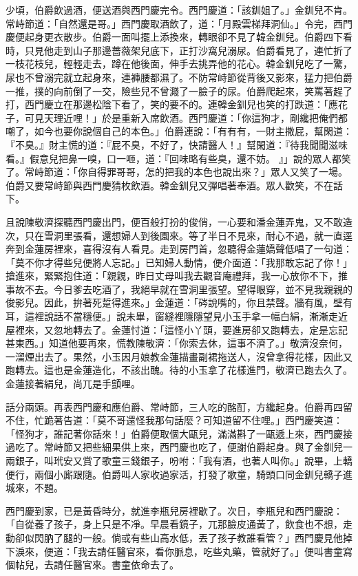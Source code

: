 少頃，伯爵飲過酒，便送酒與西門慶完令。西門慶道：「該釧姐了。」金釧兒不肯。常峙節道：「自然還是哥。」西門慶取酒飲了，道：「月殿雲梯拜洞仙。」令完，西門慶便起身更衣散步。伯爵一面叫擺上添換來，轉眼卻不見了韓金釧兒。伯爵四下看時，只見他走到山子那邊薔薇架兒底下，正打沙窩兒溺尿。伯爵看見了，連忙折了一枝花枝兒，輕輕走去，蹲在他後面，伸手去挑弄他的花心。韓金釧兒吃了一驚，尿也不曾溺完就立起身來，連褲腰都濕了。不防常峙節從背後又影來，猛力把伯爵一推，撲的向前倒了一交，險些兒不曾濺了一臉子的尿。伯爵爬起來，笑罵著趕了打，西門慶立在那邊松陰下看了，笑的要不的。連韓金釧兒也笑的打跌道：「應花子，可見天理近哩！」於是重新入席飲酒。西門慶道：「你這狗才，剛纔把俺們都嘲了，如今也要你說個自己的本色。」伯爵連說：「有有有，一財主撒屁，幫閑道：『不臭。』財主慌的道：『屁不臭，不好了，快請醫人！』幫閑道：『待我聞聞滋味看。』假意兒把鼻一嗅，口一咂，道：『回味略有些臭，還不妨。 』」說的眾人都笑了。常峙節道：「你自得罪哥哥，怎的把我的本色也說出來？」眾人又笑了一場。伯爵又要常峙節與西門慶猜枚飲酒。韓金釧兒又彈唱著奉酒。眾人歡笑，不在話下。

且說陳敬濟探聽西門慶出門，便百般打扮的俊俏，一心要和潘金蓮弄鬼，又不敢造次，只在雪洞里張看，還想婦人到後園來。等了半日不見來，耐心不過，就一直逕奔到金蓮房裡來，喜得沒有人看見。走到房門首，忽聽得金蓮嬌聲低唱了一句道：「莫不你才得些兒便將人忘記。」已知婦人動情，便介面道：「我那敢忘記了你！」搶進來，緊緊抱住道：「親親，昨日丈母叫我去觀音庵禮拜，我一心放你不下，推事故不去。今日爹去吃酒了，我絕早就在雪洞里張望。望得眼穿，並不見我親親的俊影兒。因此，拚著死踅得進來。」金蓮道：「硶說嘴的，你且禁聲。牆有風，壁有耳，這裡說話不當穩便。」說未畢，窗縫裡隱隱望見小玉手拿一幅白絹，漸漸走近屋裡來，又忽地轉去了。金蓮忖道：「這怪小丫頭，要進房卻又跑轉去，定是忘記甚東西。」知道他要再來，慌教陳敬濟：「你索去休，這事不濟了。」敬濟沒奈何，一溜煙出去了。果然，小玉因月娘教金蓮描畫副裙拖送人，沒曾拿得花樣，因此又跑轉去。這也是金蓮造化，不該出醜。待的小玉拿了花樣進門，敬濟已跑去久了。金蓮接著絹兒，尚兀是手顫哩。

話分兩頭。再表西門慶和應伯爵、常峙節，三人吃的酩酊，方纔起身。伯爵再四留不住，忙跪著告道：「莫不哥還怪我那句話麼？可知道留不住哩。」西門慶笑道： 「怪狗才，誰記著你話來！」伯爵便取個大甌兒，滿滿斟了一甌遞上來，西門慶接過吃了。常峙節又把些細果供上來，西門慶也吃了，便謝伯爵起身。與了金釧兒一兩銀子，叫玳安又賞了歌童三錢銀子，吩咐：「我有酒，也著人叫你。」說畢，上轎便行，兩個小廝跟隨。伯爵叫人家收過家活，打發了歌童，騎頭口同金釧兒轎子進城來，不題。

西門慶到家，已是黃昏時分，就進李瓶兒房裡歇了。次日，李瓶兒和西門慶說：「自從養了孩子，身上只是不凈。早晨看鏡子，兀那臉皮通黃了，飲食也不想，走動卻似閃肭了腿的一般。倘或有些山高水低，丟了孩子教誰看管？」西門慶見他掉下淚來，便道：「我去請任醫官來，看你脈息，吃些丸藥，管就好了。」便叫書童寫個帖兒，去請任醫官來。書童依命去了。

